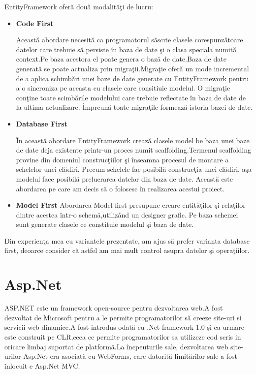 \documentclass[a4paper,12pt]{report}
\begin{document}
EntityFramework ofer\u a dou\u a modalit\u a\c ti de lucru:
\begin{itemize}
	\item \textbf{Code First}

		Aceast\u a abordare necesit\u a ca programatorul s\u ascrie clasele corespunz\u atoare datelor care trebuie s\u a persiste \^in baza de date \c si 
		o clasa speciala numit\u a context.Pe baza acestora el poate genera o baz\u a de date.Baza de date generat\u a
		se poate actualiza prin migra\c tii.Migra\c tie ofer\u a un mode incremental de a aplica schimb\u ari unei baze
		de date generate cu EntityFramework pentru a o sincroniza pe aceasta cu clasele care consitiuie modelul. O migra\c tie
		con\c tine toate scimb\u arile modelului care trebuie reflectate \^in baza de date de la ultima actualizare.
		\^Impreun\u a toate migra\c tile formeaz\u a istoria bazei de date.

	\item \textbf{Database First}

		\^In aceast\u a abordare EntityFramework creaz\u a clasele model be baza unei baze de date deja existente printr-un proces numit
		scaffolding.Termenul scaffolding provine din domeniul construc\c tiilor \c si \^inseamna procesul de montare a schelelor unei cl\u adiri.
		Precum schelele fac posibil\u a construc\c tia unei cl\u adiri, a\c sa modelul face posibil\u a prelucrarea datelor din baza de date.
		Aceast\u a este abordarea pe care am decis s\u a o folosesc \^in realizarea acestui proiect.
	\item \textbf{Model First}
		Abordarea Model first presupune creare entit\u a\c tilor \c si rela\c tilor dintre acestea \^intr-o schem\u a,utiliz\^and un designer grafic.
		Pe baza schemei sunt generate clasele ce constituie modelul \c si baza de date.
\end{itemize} 
Din experien\c ta mea cu variantele prezentate, am ajus s\u a prefer varianta database first, deoarce consider c\u a astfel am mai mult control
asupra datelor \c si opera\c tiilor.

\section{Asp.Net}

ASP.NET este un framework open-source pentru dezvoltarea web.A fost dezvoltat de Microsoft pentru a
le permite programatorilor s\u a creeze site-uri si servicii web dinamice.A fost introdus odat\u a cu
.Net framework 1.0 \c si ca urmare este construit pe CLR,ceea ce permite programatorilor sa utilizeze cod
scris in oricare limbaj suportat de platform\u a.La \^incpeuturile sale, dezvoltarea web site-urilor Asp.Net
era asociat\u a cu WebForms, care datorit\u a limit\u arilor sale a fost \^inlocuit e Asp.Net MVC. 
\end{document}
